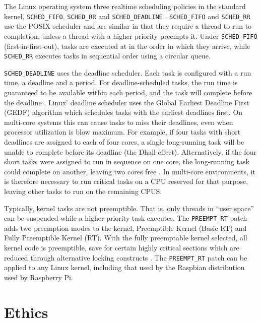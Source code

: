 The Linux operating system three realtime scheduling policies in the standard kernel, \texttt{SCHED\_FIFO}, \texttt{SCHED\_RR} and \texttt{SCHED\_DEADLINE} \cite{Foundation2018,BristotdeOliveira2018}. \texttt{SCHED\_FIFO} and \texttt{SCHED\_RR} use the POSIX scheduler and are similar in that they require a thread to run to completion, unless a thread with a higher priority preempts it. Under \texttt{SCHED\_FIFO} (first-in-first-out), tasks are executed at in the order in which they arrive, while \texttt{SCHED\_RR} executes tasks in sequential order using a circular queue. 

\texttt{SCHED\_DEADLINE} uses the deadline scheduler. Each task is configured with a run time, a deadline and a period. For deadline-scheduled tasks, the run time is guaranteed to be available within each period, and the task will complete before the deadline \cite{BristotdeOliveira2018}. Linux' deadline scheduler uses the 	Global Earliest Deadline First (GEDF) algorithm which schedules tasks with the earliest deadlines first. On multi-core systems this can cause tasks to miss their deadlines, even when processor utilization is blow maximum. For example, if four tasks with short deadlines are assigned to each of four cores, a single long-running task will be unable to complete before its deadline (the Dhall effect). Alternatively, if the four short tasks were assigned to run in sequence on one core, the long-running task could complete on another, leaving two cores free \cite{BristotdeOliveira2018a}. In multi-core environments, it is therefore necessary to run critical tasks on a CPU  reserved for that purpose, leaving other tasks to run on the remaining CPUS.

Typically, kernel tasks are not preemptible. That is, only threads in ``user space'' can be suspended while a higher-priority task executes. The \texttt{PREEMPT\_RT} patch adds two preemption modes to the kernel, Preemptible Kernel (Basic RT) and Fully Preemptible Kernel (RT). With the fully preemptable kernel selected, all kernel code is preemptible, save for certain highly critical sections which are reduced through alternative locking constructs  \cite{Foundation2018}. The \texttt{PREEMPT\_RT} patch can be applied to any Linux kernel, including that used by the Raspbian distribution used by Raspberry Pi.

\section{Ethics}

